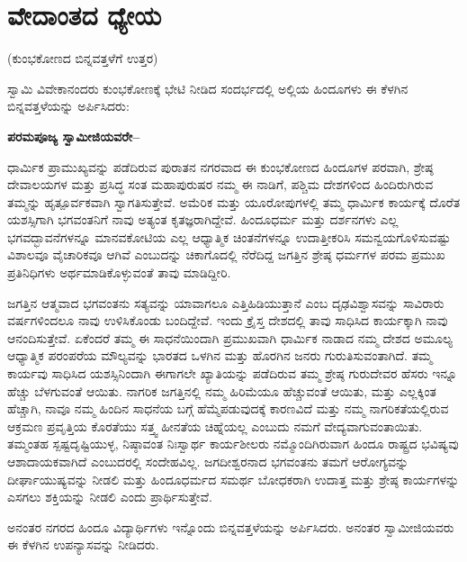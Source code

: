 
\chapter{ವೇದಾಂತದ ಧ್ಯೇಯ}

\begin{center}
(ಕುಂಭಕೋಣದ ಬಿನ್ನವತ್ತಳೆಗೆ ಉತ್ತರ)
\end{center}

ಸ್ವಾಮಿ ವಿವೇಕಾನಂದರು ಕುಂಭಕೋಣಕ್ಕೆ ಭೇಟಿ ನೀಡಿದ ಸಂದರ್ಭದಲ್ಲಿ ಅಲ್ಲಿಯ ಹಿಂದೂಗಳು ಈ ಕೆಳಗಿನ ಬಿನ್ನವತ್ತಳೆಯನ್ನು ಅರ್ಪಿಸಿದರು:

\textbf{ಪರಮಪೂಜ್ಯ ಸ್ವಾಮೀಜಿಯವರೇ–}

ಧಾರ್ಮಿಕ ಪ್ರಾಮುಖ್ಯವನ್ನು ಪಡೆದಿರುವ ಪುರಾತನ ನಗರವಾದ ಈ ಕುಂಭಕೋಣದ ಹಿಂದೂಗಳ ಪರವಾಗಿ, ಶ್ರೇಷ್ಠ ದೇವಾಲಯಗಳ ಮತ್ತು ಪ್ರಸಿದ್ಧ ಸಂತ ಮಹಾಪುರುಷರ ನಮ್ಮ ಈ ನಾಡಿಗೆ, ಪಶ್ಚಿಮ ದೇಶಗಳಿಂದ ಹಿಂದಿರುಗಿರುವ ತಮ್ಮನ್ನು ಹೃತ್ಪೂರ್ವಕವಾಗಿ ಸ್ವಾಗತಿಸುತ್ತೇವೆ. ಅಮೆರಿಕ ಮತ್ತು ಯೂರೋಪುಗಳಲ್ಲಿ ತಮ್ಮ ಧಾರ್ಮಿಕ ಕಾರ್ಯಕ್ಕೆ ದೊರೆತ ಯಶಸ್ಸಿಗಾಗಿ ಭಗವಂತನಿಗೆ ನಾವು ಅತ್ಯಂತ ಕೃತಜ್ಞರಾಗಿದ್ದೇವೆ. ಹಿಂದೂಧರ್ಮ ಮತ್ತು ದರ್ಶನಗಳು ಎಲ್ಲ ಭಗವದ್ಭಾವನೆಗಳನ್ನೂ ಮಾನವಕೋಟಿಯ ಎಲ್ಲ ಆಧ್ಯಾತ್ಮಿಕ ಚಿಂತನೆಗಳನ್ನೂ ಉದಾತ್ತೀಕರಿಸಿ ಸಮನ್ವಯಗೊಳಿಸುವಷ್ಟು ವಿಶಾಲವೂ ವೈಚಾರಿಕವೂ ಆಗಿವೆ ಎಂಬುದನ್ನು ಚಿಕಾಗೊದಲ್ಲಿ ನೆರೆದಿದ್ದ ಜಗತ್ತಿನ ಶ್ರೇಷ್ಠ ಧರ್ಮಗಳ ಪರಮ ಪ್ರಮುಖ ಪ್ರತಿನಿಧಿಗಳು ಅರ್ಥಮಾಡಿಕೊಳ್ಳುವಂತೆ ತಾವು ಮಾಡಿದ್ದೀರಿ. 

ಜಗತ್ತಿನ ಆತ್ಮವಾದ ಭಗವಂತನು ಸತ್ಯವನ್ನು ಯಾವಾಗಲೂ ಎತ್ತಿಹಿಡಿಯುತ್ತಾನೆ ಎಂಬ ದೃಢವಿಶ್ವಾಸವನ್ನು ಸಾವಿರಾರು ವರ್ಷಗಳಿಂದಲೂ ನಾವು ಉಳಿಸಿಕೊಂಡು ಬಂದಿದ್ದೇವೆ. ಇಂದು ಕ್ರೈಸ್ತ ದೇಶದಲ್ಲಿ ತಾವು ಸಾಧಿಸಿದ ಕಾರ್ಯಕ್ಕಾಗಿ ನಾವು ಆನಂದಿಸುತ್ತೇವೆ. ಏಕೆಂದರೆ ತಮ್ಮ ಈ ಸಾಧನೆಯಿಂದಾಗಿ ಪ್ರಮುಖವಾಗಿ ಧಾರ್ಮಿಕ ನಾಡಾದ ನಮ್ಮ ದೇಶದ ಅಮೂಲ್ಯ ಆಧ್ಯಾತ್ಮಿಕ ಪರಂಪರೆಯ ಮೌಲ್ಯವನ್ನು ಭಾರತದ ಒಳಗಿನ ಮತ್ತು ಹೊರಗಿನ ಜನರು ಗುರುತಿಸುವಂತಾಗಿದೆ. ತಮ್ಮ ಕಾರ್ಯವು ಸಾಧಿಸಿದ ಯಶಸ್ಸಿನಿಂದಾಗಿ ಈಗಾಗಲೇ ಖ್ಯಾತಿಯನ್ನು ಪಡೆದಿರುವ ತಮ್ಮ ಶ್ರೇಷ್ಠ ಗುರುದೇವರ ಹೆಸರು ಇನ್ನೂ ಹೆಚ್ಚು ಬೆಳಗುವಂತೆ ಆಯಿತು. ನಾಗರಿಕ ಜಗತ್ತಿನಲ್ಲಿ ನಮ್ಮ ಹಿರಿಮೆಯೂ ಹೆಚ್ಚುವಂತೆ ಆಯಿತು, ಮತ್ತು ಎಲ್ಲಕ್ಕಿಂತ ಹೆಚ್ಚಾಗಿ, ನಾವೂ ನಮ್ಮ ಹಿಂದಿನ ಸಾಧನೆಯ ಬಗ್ಗೆ ಹೆಮ್ಮೆಪಡುವುದಕ್ಕೆ ಕಾರಣವಿದೆ ಮತ್ತು ನಮ್ಮ ನಾಗರಿಕತೆಯಲ್ಲಿರುವ ಆಕ್ರಮಣ ಪ್ರವೃತ್ತಿಯ ಕೊರತೆಯು ಸತ್ತ್ವ ಹೀನತೆಯ ಚಿಹ್ನೆಯಲ್ಲ ಎಂಬುದು ನಮಗೆ ವೇದ್ಯವಾಗುವಂತಾಯಿತು. ತಮ್ಮಂತಹ ಸ್ಪಷ್ಟದೃಷ್ಟಿಯುಳ್ಳ, ನಿಷ್ಠಾವಂತ ನಿಃಸ್ವಾರ್ಥ ಕಾರ್ಯಶೀಲರು ನಮ್ಮೊಂದಿಗಿರುವಾಗ ಹಿಂದೂ ರಾಷ್ಟ್ರದ ಭವಿಷ್ಯವು ಆಶಾದಾಯಕವಾಗಿದೆ ಎಂಬುದರಲ್ಲಿ ಸಂದೇಹವಿಲ್ಲ. ಜಗದೀಶ್ವರನಾದ ಭಗವಂತನು ತಮಗೆ ಆರೋಗ್ಯವನ್ನು ದೀರ್ಘಾಯುಷ್ಯವನ್ನು ನೀಡಲಿ ಮತ್ತು ಹಿಂದೂಧರ್ಮದ ಸಮರ್ಥ ಬೋಧಕರಾಗಿ ಉದಾತ್ತ ಮತ್ತು ಶ್ರೇಷ್ಠ ಕಾರ್ಯಗಳನ್ನು ಎಸಗಲು ಶಕ್ತಿಯನ್ನು ನೀಡಲಿ ಎಂದು ಪ್ರಾರ್ಥಿಸುತ್ತೇವೆ. 

ಅನಂತರ ನಗರದ ಹಿಂದೂ ವಿದ್ಯಾರ್ಥಿಗಳು ಇನ್ನೊಂದು ಬಿನ್ನವತ್ತಳೆಯನ್ನು ಅರ್ಪಿಸಿದರು. ಅನಂತರ ಸ್ವಾಮೀಜಿಯವರು ಈ ಕೆಳಗಿನ ಉಪನ್ಯಾಸವನ್ನು ನೀಡಿದರು. 

